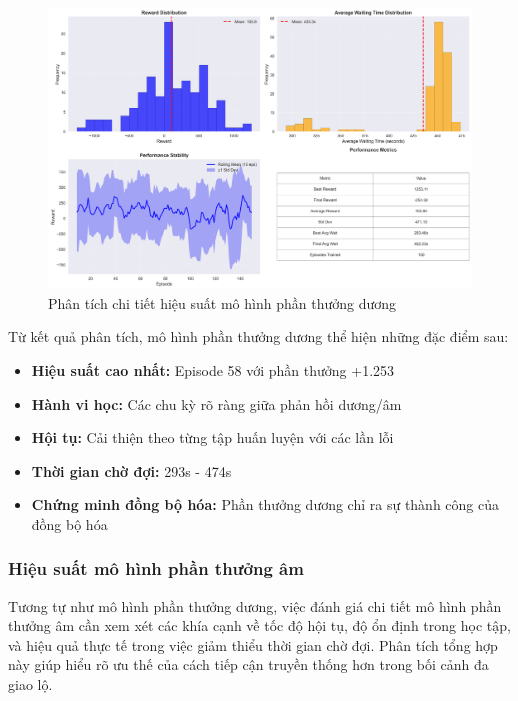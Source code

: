 \begin{figure}[!htp]
    \centering
    \includegraphics[width=\textwidth]{figures/sync_positive_model_summary.png}
    \caption{Phân tích chi tiết hiệu suất mô hình phần thưởng dương}
    \label{fig:sync_positive_model_summary}
\end{figure}

Từ kết quả phân tích, mô hình phần thưởng dương thể hiện những đặc điểm sau:
\begin{itemize}
    \item \textbf{Hiệu suất cao nhất:} Episode 58 với phần thưởng +1.253

    \item \textbf{Hành vi học:} Các chu kỳ rõ ràng giữa phản hồi dương/âm

    \item \textbf{Hội tụ:} Cải thiện theo từng tập huấn luyện với các lần lỗi

    \item \textbf{Thời gian chờ đợi:} 293s - 474s

    \item \textbf{Chứng minh đồng bộ hóa:} Phần thưởng dương chỉ ra sự thành công của đồng bộ hóa
\end{itemize}

\subsubsection{Hiệu suất mô hình phần thưởng âm}
Tương tự như mô hình phần thưởng dương, việc đánh giá chi tiết mô hình phần thưởng âm cần xem xét các khía cạnh về tốc độ hội tụ, độ ổn định trong học tập, và hiệu quả thực tế trong việc giảm thiểu thời gian chờ đợi. Phân tích tổng hợp này giúp hiểu rõ ưu thế của cách tiếp cận truyền thống hơn trong bối cảnh đa giao lộ.

